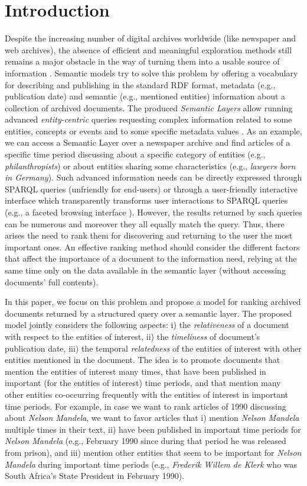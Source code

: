 \documentclass{libtex/sig-alternate-05-2015}
\begin{document}
\section{Introduction}
Despite the increasing number of digital archives worldwide
(like newspaper and web archives), the absence of efficient and meaningful
exploration methods still remains a major obstacle in the way of
turning them into a usable source of information \cite{calhoun2014exploring}.
Semantic models
try to solve this problem by offering a vocabulary for describing
and publishing in the standard RDF format, metadata (e.g.,
publication date) and semantic (e.g., mentioned
entities) information  about a collection of archived documents. The produced
{\em Semantic Layers} allow running advanced {\em entity-centric}
queries requesting complex information related to some entities,
concepts or events and to some specific metadata values
\cite{fafalios2017SemLayer}. As an example, we can access a Semantic
Layer over a newspaper archive and find articles of a specific time
period discussing about a specific category of entities (e.g., {\em
philanthropists}) or about entities sharing some characteristics
(e.g., {\em lawyers born in Germany}). Such advanced information
needs can be directly expressed through SPARQL queries (unfriendly
for end-users) or through a user-friendly interactive interface
which transparently transforms user interactions to SPARQL queries
(e.g., a faceted browsing interface \cite{tzitzikas2016faceted}).
However, the results returned by such queries can be numerous and
moreover they all equally match the query. Thus, there arises the need
to rank them for discovering and returning to the user the most
important ones. An effective ranking method should consider the
different factors that affect the importance of a document to the
information need, relying at the same time only on the data
available in the semantic layer (without accessing documents' full
contents).

In this paper, we focus on this problem and
propose a model for ranking archived documents
returned by a structured query over a semantic layer.
The proposed model jointly considers the following aspects:
i) the {\em relativeness} of a document with respect to the entities of interest,
ii) the {\em timeliness} of document's publication date,
iii) the temporal {\em relatedness} of the entities of interest with other entities
mentioned in the document.
The idea is to promote documents that
mention the entities of interest many times,
that have been published in important (for the entities of interest) time periods, and that
mention many other entities co-occurring frequently
with the entities of interest in important time periods.
For example, in case we want to rank articles of 1990
discussing about {\em Nelson Mandela},
we want to favor articles that
i) mention {\em Nelson Mandela} multiple times in their text,
ii) have been published in important time periods for {\em Nelson Mandela}
(e.g., February 1990 since during that period he was released from prison), and
iii) mention other entities that seem to be important for {\em Nelson Mandela}
during important time periods
(e.g., {\em Frederik Willem de Klerk} who was
South Africa's State President in February 1990).
\end{document}
